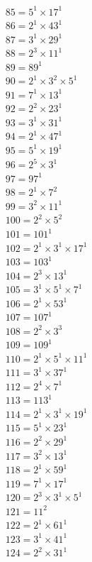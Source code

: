 \begin{equation*}
\begin{aligned}
& 85 = 5^{1} × 17^{1} \\
& 86 = 2^{1} × 43^{1} \\
& 87 = 3^{1} × 29^{1} \\
& 88 = 2^{3} × 11^{1} \\
& 89 = 89^{1} \\
& 90 = 2^{1} × 3^{2} × 5^{1} \\
& 91 = 7^{1} × 13^{1} \\
& 92 = 2^{2} × 23^{1} \\
& 93 = 3^{1} × 31^{1} \\
& 94 = 2^{1} × 47^{1} \\
& 95 = 5^{1} × 19^{1} \\
& 96 = 2^{5} × 3^{1} \\
& 97 = 97^{1} \\
& 98 = 2^{1} × 7^{2} \\
& 99 = 3^{2} × 11^{1} \\
& 100 = 2^{2} × 5^{2} \\
& 101 = 101^{1} \\
& 102 = 2^{1} × 3^{1} × 17^{1} \\
& 103 = 103^{1} \\
& 104 = 2^{3} × 13^{1} \\
& 105 = 3^{1} × 5^{1} × 7^{1} \\
& 106 = 2^{1} × 53^{1} \\
& 107 = 107^{1} \\
& 108 = 2^{2} × 3^{3} \\
& 109 = 109^{1} \\
& 110 = 2^{1} × 5^{1} × 11^{1} \\
& 111 = 3^{1} × 37^{1} \\
& 112 = 2^{4} × 7^{1} \\
& 113 = 113^{1} \\
& 114 = 2^{1} × 3^{1} × 19^{1} \\
& 115 = 5^{1} × 23^{1} \\
& 116 = 2^{2} × 29^{1} \\
& 117 = 3^{2} × 13^{1} \\
& 118 = 2^{1} × 59^{1} \\
& 119 = 7^{1} × 17^{1} \\
& 120 = 2^{3} × 3^{1} × 5^{1} \\
& 121 = 11^{2} \\
& 122 = 2^{1} × 61^{1} \\
& 123 = 3^{1} × 41^{1} \\
& 124 = 2^{2} × 31^{1} \\

\end{aligned}
\end{equation*}
